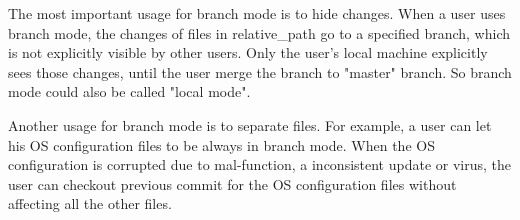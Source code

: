 The most important usage for branch mode is to hide changes. When a user
uses branch mode, the changes of files in relative\_path go to a specified
branch, which is not explicitly visible by other users. Only the user's local
machine explicitly sees those changes, until the user merge the branch to
"master" branch. So branch mode could also be called "local mode".

Another usage for branch mode is to separate files. For example, a user can
let his OS configuration files to be always in branch mode. When the OS
configuration is corrupted due to mal-function, a inconsistent update or virus,
the user can checkout previous commit for the OS configuration files without
affecting all the other files.


\iffalse
We described this in the previous section.
\subsection{Trace Level and Automatic Commit}
\hw{Mention trace level and automatic commit stuff if we have space. This
subsection should be relatively short. This is unimportant.}
\fi


